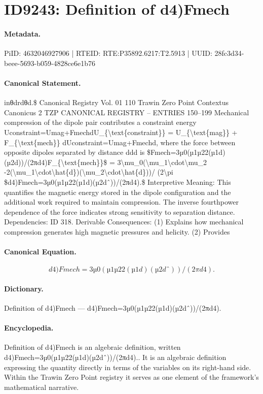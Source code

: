 \section*{ID9243: Definition of d4)Fmech}
\paragraph{Metadata.}
PiID: 4632046927906 | RTEID: RTE:P35892.6217:T2.5913 | UUID: 28fc3d34-beee-5693-b059-4828ce6e1b76

\paragraph{Canonical Statement.}
inθdrdθd.\$ Canonical Registry Vol. 01 110 Trawin Zero Point Contextus Canonicus 2 TZP CANONICAL REGISTRY – ENTRIES 150–199 Mechanical compression of the dipole pair contributes a constraint energy Uconstraint=Umag+FmechdU\_\{\textbackslash{}text\{constraint\}\} = U\_\{\textbackslash{}text\{mag\}\} + F\_\{\textbackslash{}text\{mech\}\} dUconstraint=Umag+Fmechd, where the force between opposite dipoles separated by distance ddd is \$Fmech=3µ0(µ1µ22(µ1d)(µ2d))/(2πd4)F\_\{\textbackslash{}text\{mech\}\}\$ = 3\textbackslash{}mu\_0(\textbackslash{}mu\_1\textbackslash{}cdot\textbackslash{}mu\_2 -2(\textbackslash{}mu\_1\textbackslash{}cdot\textbackslash{}hat\{d\})(\textbackslash{}mu\_2\textbackslash{}cdot\textbackslash{}hat\{d\}))/ (2\textbackslash{}pi \$d4)Fmech=3µ0(µ1µ22(µ1d)(µ2dˆ))/(2πd4).\$ Interpretive Meaning: This quantifies the magnetic energy stored in the dipole configuration and the additional work required to maintain compression. The inverse fourthpower dependence of the force indicates strong sensitivity to separation distance. Dependencies: ID 318. Derivable Consequences: (1) Explains how mechanical compression generates high magnetic pressures and helicity. (2) Provides

\paragraph{Canonical Equation.}
\[
d4)Fmech=3µ0(µ1µ22(µ1d)(µ2dˆ))/(2πd4).
\]

\paragraph{Dictionary.}
Definition of d4)Fmech — d4)Fmech=3µ0(µ1µ22(µ1d)(µ2dˆ))/(2πd4).

\paragraph{Encyclopedia.}
Definition of d4)Fmech is an algebraic definition, written d4)Fmech=3µ0(µ1µ22(µ1d)(µ2dˆ))/(2πd4).. It is an algebraic definition expressing the quantity directly in terms of the variables on its right-hand side. Within the Trawin Zero Point registry it serves as one element of the framework's mathematical narrative.
